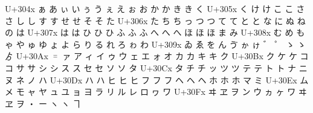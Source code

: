 \documentclass{ltjarticle}
\begin{document}
{\obeylines\ttfamily
U+304x          ぁ      あ      ぃ      い      ぅ      う      ぇ      え      ぉ      お      か      か\CB{}      き      き\CB{}      く
U+305x  く\CB{}      け      け\CB{}      こ      こ\CB{}      さ      さ\CB{}      し      し\CB{}      す      す\CB{}      せ      せ\CB{}      そ      そ\CB{}      た
U+306x  た\CB{}      ち      ち\CB{}      っ      つ      つ\CB{}      て      て\CB{}      と      と\CB{}      な      に      ぬ      ね      の      は
U+307x  は\CB{}      は\CD{}      ひ      ひ\CB{}      ひ\CD{}      ふ      ふ\CB{}      ふ\CD{}      へ      へ\CB{}      へ\CD{}      ほ      ほ\CB{}      ほ\CD{}      ま      み
U+308x  む      め      も      ゃ      や      ゅ      ゆ      ょ      よ      ら      り      る      れ      ろ      ゎ      わ
U+309x  ゐ      ゑ      を      ん      ゔ      ゕ      ゖ                      \CB{}        \CD{}        ゛      ゜      ゝ      ゝ\CB{}      ゟ 
U+30Ax  ゠      ァ      ア      ィ      イ      ゥ      ウ      ェ      エ      ォ      オ      カ      カ\CB{}      キ      キ\CB{}      ク
U+30Bx  ク\CB{}      ケ      ケ\CB{}      コ      コ\CB{}      サ      サ\CB{}      シ      シ\CB{}      ス      ス\CB{}      セ      セ\CB{}      ソ      ソ\CB{}      タ
U+30Cx  タ\CB{}      チ      チ\CB{}      ッ      ツ      ツ\CB{}      テ      テ\CB{}      ト      ト\CB{}      ナ      ニ      ヌ      ネ      ノ      ハ
U+30Dx  ハ\CB{}      ハ\CD{}      ヒ      ヒ\CB{}      ヒ\CD{}      フ      フ\CB{}      フ\CD{}      ヘ      ヘ\CB{}      ヘ\CD{}      ホ      ホ\CB{}      ホ\CD{}      マ      ミ
U+30Ex  ム      メ      モ      ャ      ヤ      ュ      ユ      ョ      ヨ      ラ      リ      ル      レ      ロ      ヮ      ワ
U+30Fx  ヰ      ヱ      ヲ      ン      ウ\CB{}      ヵ      ヶ      ワ\CB{}      ヰ\CB{}      ヱ\CB{}      ヲ\CB{}      ・      ー      ヽ      ヽ\CB{}      ヿ 
\par}
\end{document}
